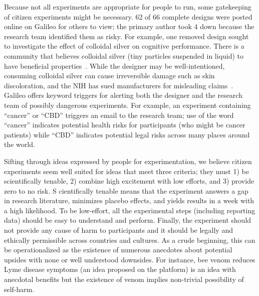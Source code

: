 Because not all experiments are appropriate for people to run, some gatekeeping of citizen experiments might be necessary. 62 of 66 complete designs were posted online on Galileo for others to view; the primary author took 4 down because the research team identified them as risky. For example, one removed design sought to investigate the effect of colloidal silver on cognitive performance. There is a community that believes colloidal silver (tiny particles suspended in liquid) to have beneficial properties~\cite{DanaLewis}. While the designer may be well-intentioned, consuming colloidal silver can cause irreversible damage such as skin discoloration, and the NIH has sued manufacturers for misleading claims~\cite{Health2018}. Galileo offers keyword triggers for alerting both the designer and the research team of possibly dangerous experiments. For example, an experiment containing “cancer” or “CBD” triggers an email to the research team; use of the word “cancer” indicates potential health risks for participants (who might be cancer patients) while “CBD” indicates potential legal risks across many places around the world.


Sifting through ideas expressed by people for experimentation, we believe citizen experiments seem well suited for ideas that meet three criteria; they must 1) be scientifically tenable, 2) combine high excitement with low efforts, and 3) provide zero to no risk. S cientifically tenable means that the experiment answers a gap in research literature, minimizes placebo effects, and yields results in a week with a high likelihood. To be low-effort, all the experimental steps (including reporting data) should be easy to understand and perform. Finally, the experiment should not provide any cause of harm to participants and it should be legally and ethically permissible across countries and cultures. As a crude beginning, this can be operationalized as the existence of numerous anecdotes about potential upsides with none or well understood downsides. For instance, bee venom reduces Lyme disease symptoms (an idea proposed on the platform) is an idea with anecdotal benefits but the existence of venom implies non-trivial possibility of self-harm.

